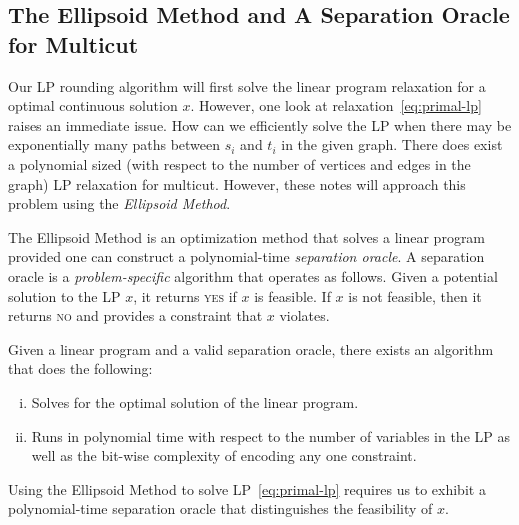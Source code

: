 
\subsection{The Ellipsoid Method and A Separation Oracle for Multicut}

Our LP rounding algorithm will first solve the linear program relaxation for a optimal continuous solution $x$. However, one look at relaxation~\ref{eq:primal-lp} raises an immediate issue. How can we efficiently solve the LP when there may be exponentially many paths between $s_i$ and $t_i$ in the given graph. There does exist a polynomial sized (with respect to the number of vertices and edges in the graph) LP relaxation for multicut. However, these notes will approach this problem using the \emph{Ellipsoid Method}.

The Ellipsoid Method is an optimization method that solves a linear program provided one can construct a polynomial-time \emph{separation oracle}. A separation oracle is a \emph{problem-specific} algorithm that operates as follows. Given a potential solution to the LP $x$, it returns \textsc{yes} if $x$ is feasible. If $x$ is not feasible, then it returns \textsc{no} and provides a constraint that $x$ violates.
\begin{theorem}
Given a linear program and a valid separation oracle, there exists an algorithm that does the following:
\vspace{-1em}
\begin{enumerate}[i.]
\item Solves for the optimal solution of the linear program.
\item Runs in polynomial time with respect to the number of variables in the LP as well as the bit-wise complexity of encoding any one constraint.
\end{enumerate}
\end{theorem}

Using the Ellipsoid Method to solve LP~\ref{eq:primal-lp} requires us to exhibit a polynomial-time separation oracle that distinguishes the feasibility of $x$.

